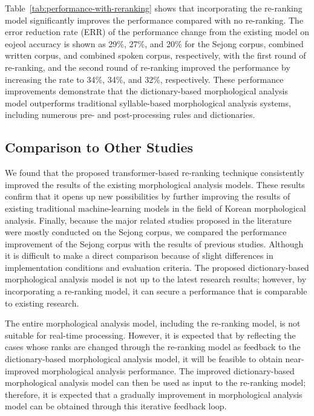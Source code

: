 \documentclass[AMS,STIX2COL]{WileyNJD-v2}
\begin{document}
    Table~\ref{tab:performance-with-reranking} shows that incorporating the re-ranking model significantly improves the performance compared with no re-ranking.
    The error reduction rate (ERR) of the performance change from the existing model on eojeol accuracy is shown as 29\%, 27\%, and 20\% for the Sejong corpus, combined written corpus, and combined spoken corpus, respectively, with the first round of re-ranking, and the second round of re-ranking improved the performance by increasing the rate to 34\%, 34\%, and 32\%, respectively.
    These performance improvements demonstrate that the dictionary-based morphological analysis model outperforms traditional syllable-based morphological analysis systems, including numerous pre- and post-processing rules and dictionaries.

    \subsection{Comparison to Other Studies}\label{subsec:comparison-to-other-studies}

    We found that the proposed transformer-based re-ranking technique consistently improved the results of the existing morphological analysis models.
    These results confirm that it opens up new possibilities by further improving the results of existing traditional machine-learning models in the field of Korean morphological analysis.
    Finally, because the major related studies proposed in the literature were mostly conducted on the Sejong corpus, we compared the performance improvement of the Sejong corpus with the results of previous studies.
    Although it is difficult to make a direct comparison because of slight differences in implementation conditions and evaluation criteria.
    The proposed dictionary-based morphological analysis model is not up to the latest research results; however, by incorporating a re-ranking model, it can secure a performance that is comparable to existing research.

    The entire morphological analysis model, including the re-ranking model, is not suitable for real-time processing.
    However, it is expected that by reflecting the cases whose ranks are changed through the re-ranking model as feedback to the dictionary-based morphological analysis model, it will be feasible to obtain near-improved morphological analysis performance.
    The improved dictionary-based morphological analysis model can then be used as input to the re-ranking model; therefore, it is expected that a gradually improvement in morphological analysis model can be obtained through this iterative feedback loop.
\end{document}
